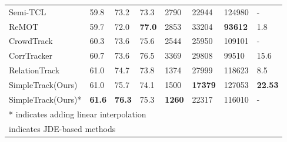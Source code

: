 \documentclass[runningheads]{llncs}
\begin{document}
\begin{table}
\begin{center}
\begin{tabular}{llllllll}
Semi-TCL\cite{wang2021joint} & 59.8 & 73.2 & 73.3  & 2790 & 22944 & 124980 & -\\
ReMOT\cite{yang2021remot} & 59.7 & 72.0 & \textbf{77.0} & 2853 & 33204 & \textbf{93612} & 1.8\\
CrowdTrack\cite{stadler2021performance} & 60.3 & 73.6 & 75.6 & 2544 & 25950 & 109101 & -\\
CorrTracker\cite{wang2021multiple} & 60.7 & 73.6 & 76.5 & 3369 & 29808 & 99510 & 15.6\\
RelationTrack\cite{yu2022relationtrack} & 61.0 & 74.7 & 73.8  & 1374 & 27999 & 118623 & 8.5\\
SimpleTrack(Ours) & 61.0 & 75.7 & 74.1  & 1500  & \textbf{17379} & 127053 & \textbf{22.53}\\
SimpleTrack(Ours)* & \textbf{61.6} & \textbf{76.3} & 75.3  & \textbf{1260}  & 22317 & 116010 & -\\
\hline
\multicolumn{4}{l}{* indicates adding linear interpolation} \\
\multicolumn{4}{l}{ indicates JDE-based methods}

\end{tabular}
\end{center}
\end{table}
\setlength{\tabcolsep}{1.4pt}
\end{document}
